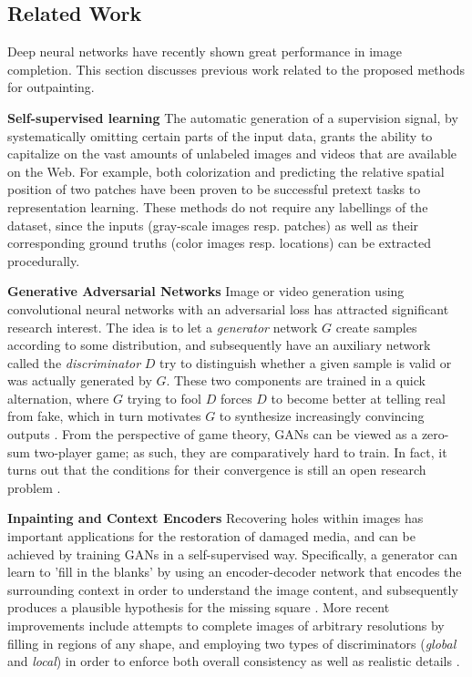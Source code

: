 \documentclass[twocolumn,showpacs,%
  nofootinbib,aps,superscriptaddress,%
  eqsecnum,prd,notitlepage,showkeys,10pt]{revtex4-1}
\begin{document}
\subsection{Related Work}

Deep neural networks have recently shown great performance in image completion. This section discusses previous work related to the proposed methods for outpainting.

\textbf{Self-supervised learning} \hspace{0.3cm}
The automatic generation of a supervision signal, by systematically omitting certain parts of the input data, grants the ability to capitalize on the vast amounts of unlabeled images and videos that are available on the Web. For example, both colorization \cite{Larsson2017} and predicting the relative spatial position of two patches \cite{Doersch2015, Noroozi2016} have been proven to be successful pretext tasks to representation learning. These methods do not require any labellings of the dataset, since the inputs (gray-scale images resp. patches) as well as their corresponding ground truths (color images resp. locations) can be extracted procedurally.

\textbf{Generative Adversarial Networks} \hspace{0.3cm}
Image or video generation using convolutional neural networks with an adversarial loss \cite{Goodfellow2014} has attracted significant research interest. The idea is to let a \textit{generator} network $G$ create samples according to some distribution, and subsequently have an auxiliary network called the \textit{discriminator} $D$ try to distinguish whether a given sample is valid or was actually generated by $G$. These two components are trained in a quick alternation, where $G$ trying to fool $D$ forces $D$ to become better at telling real from fake, which in turn motivates $G$ to synthesize increasingly convincing outputs \cite{Iizuka2017}. From the perspective of game theory, GANs can be viewed as a zero-sum two-player game; as such, they are comparatively hard to train. In fact, it turns out that the conditions for their convergence is still an open research problem \cite{Mescheder2018}.

\textbf{Inpainting and Context Encoders} \hspace{0.3cm}
Recovering holes within images has important applications for the restoration of damaged media, and can be achieved by training GANs in a self-supervised way. Specifically, a generator can learn to 'fill in the blanks' by using an encoder-decoder network that encodes the surrounding context in order to understand the image content, and subsequently produces a plausible hypothesis for the missing square \cite{Pathak2016}. More recent improvements include attempts to complete images of arbitrary resolutions by filling in regions of any shape, and employing two types of discriminators (\textit{global} and \textit{local}) in order to enforce both overall consistency as well as realistic details \cite{Iizuka2017}.
\end{document}
